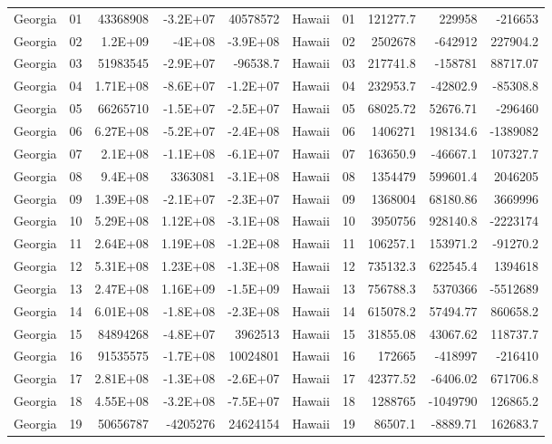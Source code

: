 \begin{landscape}
\begin{singlespace}
\begin{longtable}{lrrrr|lrrrr}
		Georgia &  01  & 43368908 & -3.2E+07 & 40578572 & Hawaii &  01  & 121277.7 & 229958 & -216653 \\
		Georgia &  02  & 1.2E+09 & -4E+08 & -3.9E+08 & Hawaii &  02  & 2502678 & -642912 & 227904.2 \\
		Georgia &  03  & 51983545 & -2.9E+07 & -96538.7 & Hawaii &  03  & 217741.8 & -158781 & 88717.07 \\
		Georgia &  04  & 1.71E+08 & -8.6E+07 & -1.2E+07 & Hawaii &  04  & 232953.7 & -42802.9 & -85308.8 \\
		Georgia &  05  & 66265710 & -1.5E+07 & -2.5E+07 & Hawaii &  05  & 68025.72 & 52676.71 & -296460 \\
		Georgia &  06  & 6.27E+08 & -5.2E+07 & -2.4E+08 & Hawaii &  06  & 1406271 & 198134.6 & -1389082 \\
		Georgia &  07  & 2.1E+08 & -1.1E+08 & -6.1E+07 & Hawaii &  07  & 163650.9 & -46667.1 & 107327.7 \\
		Georgia &  08  & 9.4E+08 & 3363081 & -3.1E+08 & Hawaii &  08  & 1354479 & 599601.4 & 2046205 \\
		Georgia &  09  & 1.39E+08 & -2.1E+07 & -2.3E+07 & Hawaii &  09  & 1368004 & 68180.86 & 3669996 \\
		Georgia &  10 & 5.29E+08 & 1.12E+08 & -3.1E+08 & Hawaii &  10 & 3950756 & 928140.8 & -2223174 \\
		Georgia &  11 & 2.64E+08 & 1.19E+08 & -1.2E+08 & Hawaii &  11 & 106257.1 & 153971.2 & -91270.2 \\
		Georgia &  12 & 5.31E+08 & 1.23E+08 & -1.3E+08 & Hawaii &  12 & 735132.3 & 622545.4 & 1394618 \\
		Georgia &  13 & 2.47E+08 & 1.16E+09 & -1.5E+09 & Hawaii &  13 & 756788.3 & 5370366 & -5512689 \\
		Georgia &  14 & 6.01E+08 & -1.8E+08 & -2.3E+08 & Hawaii &  14 & 615078.2 & 57494.77 & 860658.2 \\
		Georgia &  15 & 84894268 & -4.8E+07 & 3962513 & Hawaii &  15 & 31855.08 & 43067.62 & 118737.7 \\
		Georgia &  16 & 91535575 & -1.7E+08 & 10024801 & Hawaii &  16 & 172665 & -418997 & -216410 \\
		Georgia &  17 & 2.81E+08 & -1.3E+08 & -2.6E+07 & Hawaii &  17 & 42377.52 & -6406.02 & 671706.8 \\
		Georgia &  18 & 4.55E+08 & -3.2E+08 & -7.5E+07 & Hawaii &  18 & 1288765 & -1049790 & 126865.2 \\
		Georgia &  19 & 50656787 & -4205276 & 24624154 & Hawaii &  19 & 86507.1 & -8889.71 & 162683.7 \\

\end{longtable}
\end{singlespace}
\end{landscape}
